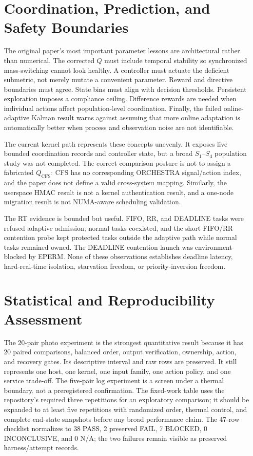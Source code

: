 \documentclass[10pt,letterpaper,twocolumn]{article}
\begin{document}
\section{Coordination, Prediction, and Safety Boundaries}

The original paper's most important parameter lessons are architectural rather than numerical. The corrected $Q$ must include temporal stability so synchronized mass-switching cannot look healthy. A controller must actuate the deficient submetric, not merely mutate a convenient parameter. Reward and directive boundaries must agree. State bins must align with decision thresholds. Persistent exploration imposes a compliance ceiling. Difference rewards are needed when individual actions affect population-level coordination. Finally, the failed online-adaptive Kalman result warns against assuming that more online adaptation is automatically better when process and observation noise are not identifiable.

The current kernel path represents these concepts unevenly. It exposes live bounded coordination records and controller state, but a broad $S_1$--$S_4$ population study was not completed. The correct comparison posture is not to assign a fabricated $Q_{\mathrm{CFS}}$: CFS has no corresponding ORCHESTRA signal/action index, and the paper does not define a valid cross-system mapping. Similarly, the userspace HMAC result is not a kernel authentication result, and a one-node migration result is not NUMA-aware scheduling validation.

The RT evidence is bounded but useful. FIFO, RR, and DEADLINE tasks were refused adaptive admission; normal tasks coexisted, and the short FIFO/RR contention probe kept protected tasks outside the adaptive path while normal tasks remained owned. The DEADLINE contention launch was environment-blocked by EPERM. None of these observations establishes deadline latency, hard-real-time isolation, starvation freedom, or priority-inversion freedom.

\section{Statistical and Reproducibility Assessment}

The 20-pair photo experiment is the strongest quantitative result because it has 20 paired comparisons, balanced order, output verification, ownership, action, and recovery gates. Its descriptive interval and raw rows are preserved. It still represents one host, one kernel, one input family, one action policy, and one service trade-off. The five-pair log experiment is a screen under a thermal boundary, not a preregistered confirmation. The fixed-work table uses the repository’s required three repetitions for an exploratory comparison; it should be expanded to at least five repetitions with randomized order, thermal control, and complete end-state snapshots before any broad performance claim. The 47-row checklist normalizes to 38 PASS, 2 preserved FAIL, 7 BLOCKED, 0 INCONCLUSIVE, and 0 N/A; the two failures remain visible as preserved harness/attempt records.
\end{document}
